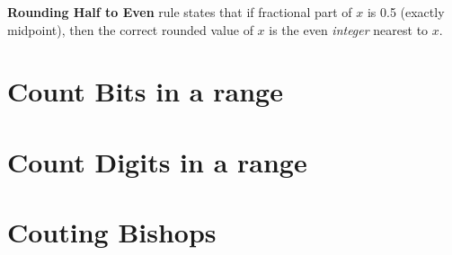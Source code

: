     \textbf{Rounding Half to Even} rule states that 
    if fractional part of $x$ is 0.5 (exactly midpoint), then the correct rounded value of $x$ is the even \textit{integer} nearest to $x$.


\section{Count Bits in a range}


\section{Count Digits in a range}


\section{Couting Bishops}

